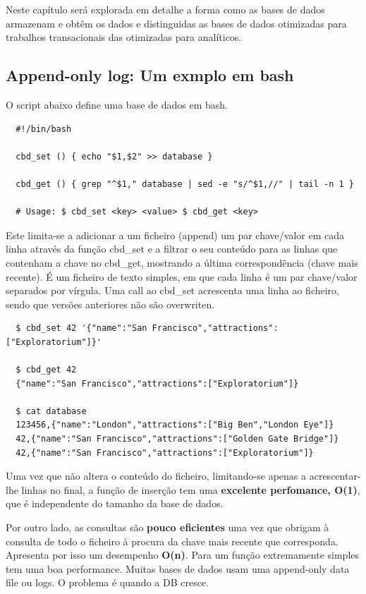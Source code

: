 \documentclass{article}
\begin{document}
Neste capítulo será explorada em detalhe a forma como as bases de dados armazenam e
obtêm os dados e distinguidas as bases de dados otimizadas para trabalhos transacionais das
otimizadas para analíticos.

\subsection{Append-only log: Um exmplo em bash}

O script abaixo define uma base de dados em bash.

\begin{lstlisting}
  #!/bin/bash

  cbd_set () { echo "$1,$2" >> database }

  cbd_get () { grep "^$1," database | sed -e "s/^$1,//" | tail -n 1 }

  # Usage: $ cbd_set <key> <value> $ cbd_get <key>
\end{lstlisting}

Este limita-se a adicionar a um ficheiro (append) um par chave/valor em cada
linha através da função cbd\_set e a filtrar o seu conteúdo para as linhas que
contenham a chave no cbd\_get, mostrando a última correspondência (chave mais
recente). É um ficheiro de texto simples, em que cada linha é um par chave/valor
separados por vírgula. Uma call ao cbd\_set acrescenta uma linha ao ficheiro,
sendo que versões anteriores não são overwriten.

\begin{lstlisting}
  $ cbd_set 42 '{"name":"San Francisco","attractions":["Exploratorium"]}'

  $ cbd_get 42
  {"name":"San Francisco","attractions":["Exploratorium"]}

  $ cat database
  123456,{"name":"London","attractions":["Big Ben","London Eye"]}
  42,{"name":"San Francisco","attractions":["Golden Gate Bridge"]}
  42,{"name":"San Francisco","attractions":["Exploratorium"]}
\end{lstlisting}

\pagebreak

Uma vez que não altera o conteúdo do ficheiro, limitando-se apenas a acrescentar-lhe linhas no
final, a função de inserção tem uma \textbf{excelente perfomance, O(1)}, que é independente do
tamanho da base de dados.

Por outro lado, as consultas são \textbf{pouco eficientes} uma vez que obrigam à consulta de todo o
ficheiro à procura da chave mais recente que corresponda. Apresenta por isso um
desempenho \textbf{O(n)}. Para um função extremamente simples tem uma boa performance.
Muitas bases de dados usam uma append-only data file ou logs. O problema é quando a DB cresce.
\end{document}
